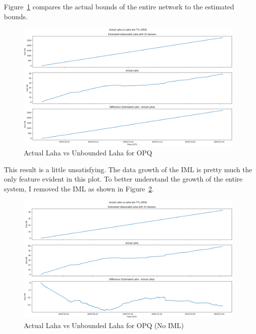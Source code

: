 Figure~\ref{fig:actual_laha_vs_unbounded_opq} compares the actual bounds of the entire network to the estimated bounds.

\begin{figure}[H]
    \centering
    \includegraphics[width=\linewidth]{figures/actual_laha_vs_unbounded_opq.png}
    \caption{Actual Laha vs Unbounded Laha for OPQ}
    \label{fig:actual_laha_vs_unbounded_opq}
\end{figure}

This result is a little unsatisfying. The data growth of the IML is pretty much the only feature evident in this plot. To better understand the growth of the entire system, I removed the IML as shown in Figure~\ref{fig:actual_laha_vs_unbounded_no_iml_opq}.

\begin{figure}[H]
    \centering
    \includegraphics[width=\linewidth]{figures/actual_laha_vs_unbounded_opq_no_iml.png}
    \caption{Actual Laha vs Unbounded Laha for OPQ (No IML)}
    \label{fig:actual_laha_vs_unbounded_no_iml_opq}
\end{figure}

